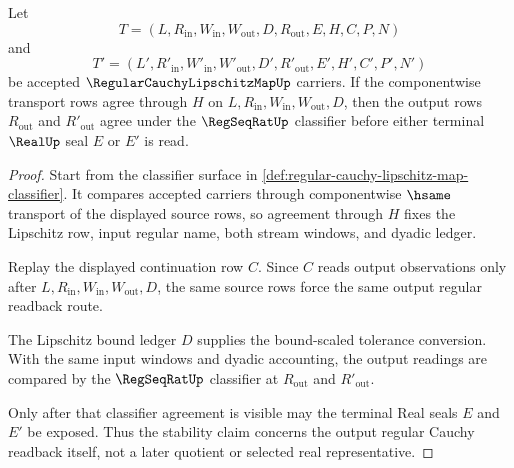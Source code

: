 \begin{theorem}
\label{thm:regular-cauchy-lipschitz-map-output-classifier-stability}
Let
$$
T=(L,R_{\mathrm{in}},W_{\mathrm{in}},W_{\mathrm{out}},D,R_{\mathrm{out}},E,H,C,P,N)
$$
and
$$
T'=(L',R'_{\mathrm{in}},W'_{\mathrm{in}},W'_{\mathrm{out}},D',R'_{\mathrm{out}},E',H',C',P',N')
$$
be accepted $\RegularCauchyLipschitzMapUp$ carriers. If the componentwise transport rows agree through $H$ on $L,R_{\mathrm{in}},W_{\mathrm{in}},W_{\mathrm{out}},D$, then the output rows $R_{\mathrm{out}}$ and $R'_{\mathrm{out}}$ agree under the $\RegSeqRatUp$ classifier before either terminal $\RealUp$ seal $E$ or $E'$ is read.
\end{theorem}
\begin{proof}
Start from the classifier surface in \autoref{def:regular-cauchy-lipschitz-map-classifier}. It compares accepted carriers through componentwise $\hsame$ transport of the displayed source rows, so agreement through $H$ fixes the Lipschitz row, input regular name, both stream windows, and dyadic ledger.

Replay the displayed continuation row $C$. Since $C$ reads output observations only after $L,R_{\mathrm{in}},W_{\mathrm{in}},W_{\mathrm{out}},D$, the same source rows force the same output regular readback route.

The Lipschitz bound ledger $D$ supplies the bound-scaled tolerance conversion. With the same input windows and dyadic accounting, the output readings are compared by the $\RegSeqRatUp$ classifier at $R_{\mathrm{out}}$ and $R'_{\mathrm{out}}$.

Only after that classifier agreement is visible may the terminal Real seals $E$ and $E'$ be exposed. Thus the stability claim concerns the output regular Cauchy readback itself, not a later quotient or selected real representative.
\end{proof}


